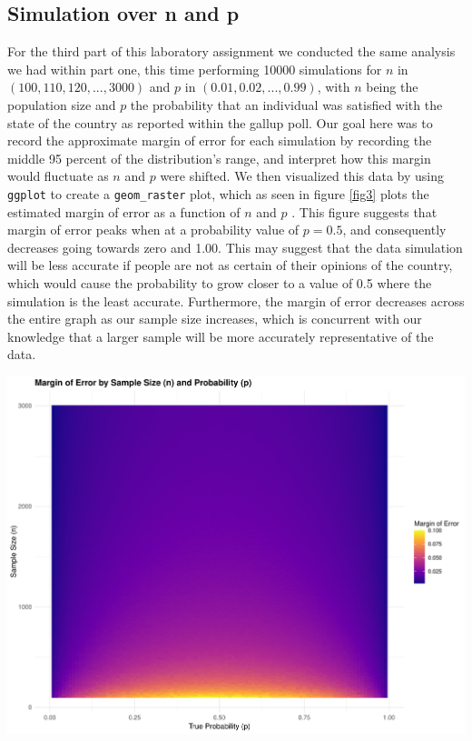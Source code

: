 \documentclass{article}\usepackage[]{graphicx}\usepackage[]{xcolor}
\newenvironment{Figure}
  {\par\medskip\noindent\minipage{\linewidth}}
  {\endminipage\par\medskip}
\begin{document}
\begin{multicols}{2}
\section{Simulation over n and p}
For the third part of this laboratory assignment we conducted the same analysis we had within part one, this time performing 10000 simulations for $n$ in $(100, 110, 120,...,3000)$ and $p$ in $(0.01, 0.02,...,0.99)$, with $n$ being the population size and $p$ the probability that an individual was satisfied with the state of the country as reported within the gallup poll. Our goal here was to record the approximate margin of error for each simulation by recording the middle 95 percent of the distribution's range, and interpret how this margin would fluctuate as $n$ and $p$ were shifted. We then visualized this data by using \texttt{ggplot} to create a \texttt{geom\_raster} plot, which as seen in figure \ref{fig3} plots the estimated margin of error as a function of $n$ and $p$ \citep{ggplot}. This figure suggests that margin of error peaks when at a probability value of $p = 0.5$, and consequently decreases going towards zero and 1.00. This may suggest that the data simulation will be less accurate if people are not as certain of their opinions of the country, which would cause the probability to grow closer to a value of 0.5 where the simulation is the least accurate. Furthermore, the margin of error decreases across the entire graph as our sample size increases, which is concurrent with our knowledge that a larger sample will be more accurately representative of the data.
\begin{Figure}
\includegraphics[scale=0.4]{pt3plot.pdf}
\label{fig3}
\end{Figure}

\end{multicols}
\end{document}
